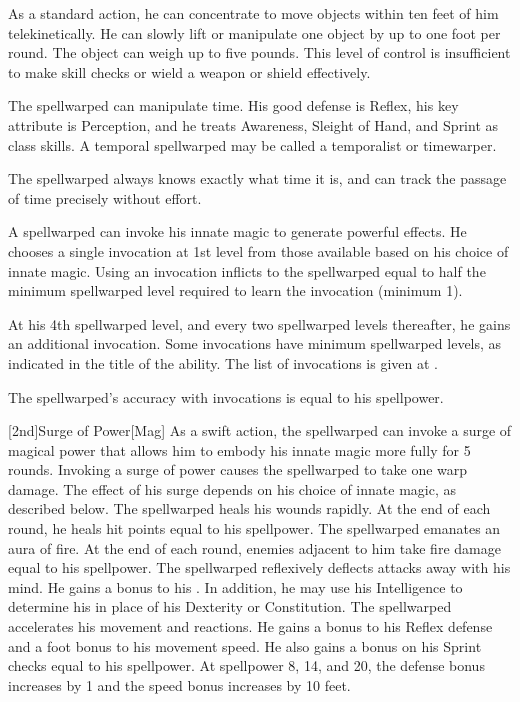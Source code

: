         As a standard action, he can concentrate to move objects within ten feet of him telekinetically.
        He can slowly lift or manipulate one object by up to one foot per round.
        The object can weigh up to five pounds.
        This level of control is insufficient to make skill checks or wield a weapon or shield effectively.

        The spellwarped can manipulate time.
        His good defense is Reflex, his key attribute is Perception, and he treats Awareness, Sleight of Hand, and Sprint as class skills.
        A temporal spellwarped may be called a temporalist or timewarper.

        The spellwarped always knows exactly what time it is, and can track the passage of time precisely without effort.

        A spellwarped can invoke his innate magic to generate powerful effects.
        He chooses a single invocation at 1st level from those available based on his choice of innate magic.
        Using an invocation inflicts  to the spellwarped equal to half the minimum spellwarped level required to learn the invocation (minimum 1).

        At his 4th spellwarped level, and every two spellwarped levels thereafter, he gains an additional invocation.
        Some invocations have minimum spellwarped levels, as indicated in the title of the ability.
        The list of invocations is given at .

        The spellwarped's accuracy with invocations is equal to his spellpower.

        [2nd]{Surge of Power}[Mag]
        As a swift action, the spellwarped can invoke a surge of magical power that allows him to embody his innate magic more fully for 5 rounds.
        Invoking a surge of power causes the spellwarped to take one warp damage.
        The effect of his surge depends on his choice of innate magic, as described below.
        The spellwarped heals his wounds rapidly.
        At the end of each round, he heals hit points equal to his spellpower.
        The spellwarped emanates an aura of fire.
        At the end of each round, enemies adjacent to him take fire damage equal to his spellpower.
        The spellwarped reflexively deflects attacks away with his mind.
        He gains a  bonus to his .
        In addition, he may use his Intelligence to determine his  in place of his Dexterity or Constitution.
        The spellwarped accelerates his movement and reactions.
        He gains a  bonus to his Reflex defense and a  foot bonus to his movement speed.
        He also gains a bonus on his Sprint checks equal to his spellpower.
        At spellpower 8, 14, and 20, the defense bonus increases by 1 and the speed bonus increases by 10 feet.

